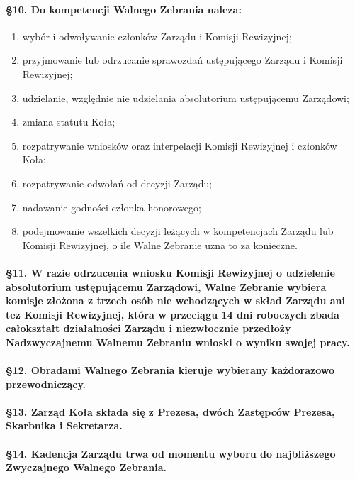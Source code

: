 \documentclass{article}
\begin{document}
		\paragraph{\S 10. Do kompetencji Walnego Zebrania naleza:}
		\begin{enumerate}
			\item wybór i odwoływanie członków Zarządu i Komisji Rewizyjnej;
			\item przyjmowanie lub odrzucanie sprawozdań ustępującego Zarządu i Komisji Rewizyjnej;
			\item udzielanie, względnie nie udzielania absolutorium ustępującemu Zarządowi;
			\item zmiana statutu Koła;
			\item rozpatrywanie wniosków oraz interpelacji Komisji Rewizyjnej i członków Koła;
			\item rozpatrywanie odwołań od decyzji Zarządu;
			\item nadawanie godności członka honorowego;
			\item podejmowanie wszelkich decyzji leżących w kompetencjach Zarządu lub Komisji Rewizyjnej, o ile Walne Zebranie uzna to za konieczne.
		\end{enumerate}
		\paragraph{\S 11. W razie odrzucenia wniosku Komisji Rewizyjnej o udzielenie absolutorium ustępującemu Zarządowi,
                           Walne Zebranie wybiera komisje złożona z trzech osób nie wchodzących w skład Zarządu ani tez Komisji Rewizyjnej, która w
                           przeciągu 14 dni roboczych zbada całokształt działalności Zarządu i niezwłocznie przedłoży Nadzwyczajnemu Walnemu Zebraniu
                           wnioski o wyniku swojej pracy.}
		\paragraph{\S 12. Obradami Walnego Zebrania kieruje wybierany każdorazowo przewodniczący.}
		\paragraph{\S 13. Zarząd Koła składa się z Prezesa, dwóch Zastępców Prezesa, Skarbnika i Sekretarza.}
		\paragraph{\S 14. Kadencja Zarządu trwa od momentu wyboru do najbliższego Zwyczajnego Walnego Zebrania.}
\end{document}
